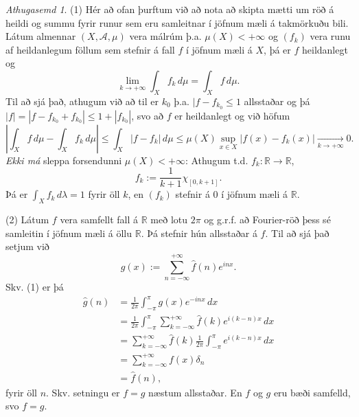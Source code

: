 \documentclass[a4paper,icelandic,11pt]{book}
\theoremstyle{plain}      \newtheorem{setn}{Setning}[chapter]
\theoremstyle{definition} \newtheorem{skilgr}[setn]{Skilgreining}
\theoremstyle{remark}     \newtheorem*{ath}{Athugasemd}
\newcommand{\R}{\mathbb R}
\begin{document}
\begin{ath}
  (1) Hér að ofan þurftum við að nota að skipta mætti um röð á heildi
  og summu fyrir runur sem eru samleitnar í jöfnum mæli á takmörkuðu
  bili. Látum almennar $(X,\mathcal A,\mu)$ vera málrúm
  þ.a. $\mu(X)<+\infty$ og $(f_{k})$ vera runu af heildanlegum föllum
  sem stefnir á fall $f$ í jöfnum mæli á $X$, þá er $f$ heildanlegt og 
  \[
  \lim_{k\to +\infty}\int_{X}f_{k}\,d\mu
  = \int_{X}f\,d\mu.
  \]
  Til að sjá það, athugum við að til er $k_{0}$ þ.a. $|f-f_{k_{0}}\le
  1$ allsstaðar og þá $|f|=|f-f_{k_{0}}+f_{k_{0}}|\le 1 +
  |f_{k_{0}}|$, svo að $f$ er heildanlegt og við höfum 
  \[
  \left|
    \int_{X}f\,d\mu
    - \int_{X} f_{k}\,d\mu
  \right|
  \le \int_{X}|f-f_{k}|\,d\mu
  \le \mu(X)\sup_{x\in X}|f(x) - f_{k}(x)|
  \xrightarrow[k\to+\infty]{} 0.
  \]
  \emph{Ekki má} sleppa forsendunni $\mu(X)<+\infty$: Athugum
  t.d. $f_{k}:\R\to\R$, 
  \[
  f_{k} := \frac{1}{k+1}\chi_{[0,k+1]}.
  \]
  Þá er $\int_{X}f_{k}\,d\lambda = 1$ fyrir öll $k$, en $(f_{k})$
  stefnir á $0$ í jöfnum mæli á $\R$.

  (2) Látum $f$ vera samfellt fall á $\R$ með lotu $2\pi$ og g.r.f. að
  Fourier-röð þess sé samleitin í jöfnum mæli á öllu $\R$. Þá stefnir
  hún allsstaðar á $f$. Til að sjá það setjum við 
  \[
  g(x) := \sum_{n=-\infty}^{+\infty} \hat f(n)e^{inx}.
  \]
  Skv. (1) er þá
  \begin{align*}
    \hat g(n)
    &= \frac{1}{2\pi} \int_{-\pi}^{\pi}g(x)e^{-inx}\,dx
    \\
    &= \frac{1}{2\pi} \int_{-\pi}^{\pi}\sum_{k=-\infty}^{+\infty}
    \hat f(k)e^{i(k-n)x}\,dx
    \\
    &= \sum_{k=-\infty}^{+\infty}\hat f(k)\frac{1}{2\pi}
    \int_{-\pi}^{\pi}e^{i(k-n)x}\,dx
    \\
    &= \sum_{k=-\infty}^{+\infty}f(x)\delta_{n}
    \\
    &= \hat f(n),
  \end{align*}
  fyrir öll $n$. Skv. setningu er $f=g$ næstum allsstaðar. En $f$ og
  $g$ eru bæði samfelld, svo $f=g$.


\end{ath}
\end{document}
